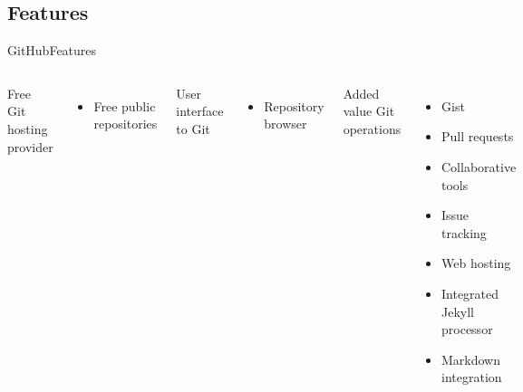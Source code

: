 \documentclass[10pt,compress]{beamer} %
\begin{document}
\subsection{Features}
\begin{frame}{GitHub}{Features}
	\begin{columns}
		Free Git hosting provider
		\begin{itemize}
			\item Free public repositories
		\end{itemize}
		User interface to Git
		\begin{itemize}
			\item Repository browser
		\end{itemize}
		Added value Git operations
		\begin{itemize}
			\item Gist
			\item Pull requests	
			\item Collaborative tools
			\item Issue tracking
			\item Web hosting
			\item Integrated Jekyll processor
			\item Markdown integration
		\end{itemize}
	\begin{center}
 		\includegraphics[width=.8\textwidth]{figs/github-logo}
	\end{center}
	\end{columns}
\end{frame}
\end{document}
